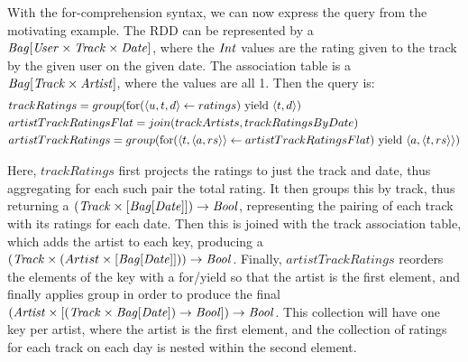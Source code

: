 {{{{With the for-comprehension syntax, we can now express the query from the motivating example. The  RDD can be represented by a $\textrm{\textit{Bag}}[\textrm{\textit{User}} \times \textrm{\textit{Track}} \times \textrm{\textit{Date}}]$, where the $\textrm{\textit{Int}}$ values are the rating given to the track by the given user on the given date. The association table is a $\textrm{\textit{Bag}}[\textrm{\textit{Track}} \times \textrm{\textit{Artist}}]$, where the values are all 1. Then the query is:
\begin{equation*}
\begin{split}
&trackRatings = group(\textrm{for}(\langle u,t,d \rangle \leftarrow ratings) \textrm{ yield } \langle t, d \rangle) \\
&artistTrackRatingsFlat = join(trackArtists,trackRatingsByDate) \\
&artistTrackRatings = group( \textrm{for}(\langle t,\langle a,rs \rangle \rangle \leftarrow artistTrackRatingsFlat) \textrm{ yield } \langle a, \langle t,rs \rangle \rangle)
\end{split}
\end{equation*}

Here, $trackRatings$ first projects the ratings to just the track and date, thus aggregating for each such pair the total rating. It then groups this by track, thus returning a $(\textrm{\textit{Track}} \times [\textrm{\textit{Bag}}[\textrm{\textit{Date}}]]) \rightarrow \textrm{\textit{Bool}}$, representing the pairing of each track with its ratings for each date. Then this is joined with the track association table, which adds the artist to each key, producing a $(\textrm{\textit{Track}} \times (Artist \times [\textrm{\textit{Bag}}[\textrm{\textit{Date}}]])) \rightarrow \textrm{\textit{Bool}}$. Finally, $artistTrackRatings$ reorders the elements of the key with a for/yield so that the artist is the first element, and finally applies group in order to produce the final
$(\textrm{\textit{Artist}} \times [(\textrm{\textit{Track}} \times \textrm{\textit{Bag}}[\textrm{\textit{Date}}]) \rightarrow \textrm{\textit{Bool}}]) \rightarrow \textrm{\textit{Bool}}$. This collection will have one key per artist, where the artist is the first element, and the collection of ratings for each track on each day is nested within the second element.
}

}}}
